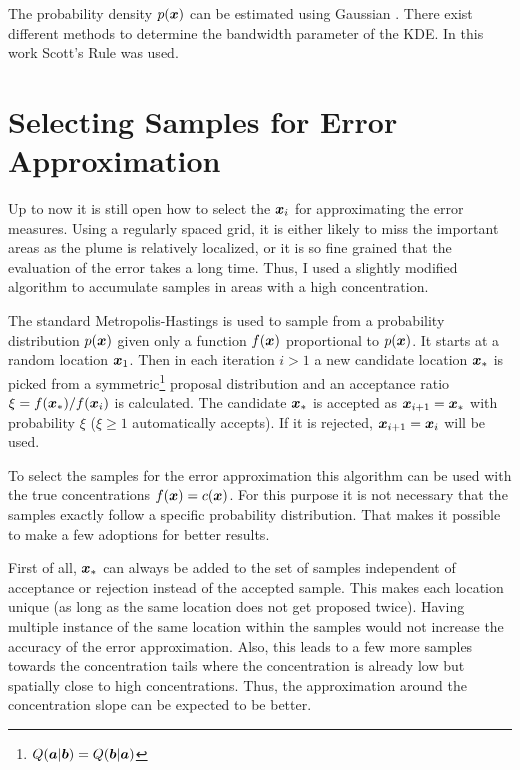 The probability density $p(\bm{x})$ can be estimated using Gaussian 
. There exist different methods to 
determine the bandwidth parameter of the KDE\@. In this work Scott's Rule 
\parencite{Scott:2009tl} was used.

\section{Selecting Samples for Error Approximation}\label{sec:mh}
Up to now it is still open how to select the $\bm{x}_i$ for approximating the 
error measures.  Using a regularly spaced grid, it is either likely to miss the 
important areas as the plume is relatively localized, or it is so fine grained 
that the evaluation of the error takes a long time. Thus, I used a slightly 
modified  algorithm to accumulate samples in 
areas with a high concentration.

The standard Metropolis-Hastings \parencite{Chib:1994ud} is used to sample from 
a probability distribution $p(\bm{x})$ given only a function $f(\bm{x})$ 
proportional to $p(\bm{x})$. It starts at a random location $\bm{x}_1$.  Then in 
each iteration $i > 1$ a new candidate location $\bm{x}_*$ is picked from 
a symmetric\footnote{$Q(\bm{a} | \bm{b}) = Q(\bm{b} | \bm{a})$} proposal 
distribution and an acceptance ratio $\xi = f(\bm{x}_*) / f(\bm{x}_i)$ is 
calculated. The candidate $\bm{x}_*$ is accepted as $\bm{x}_{i + 1} = \bm{x}_*$ 
with probability $\xi$ ($\xi \geq 1$ automatically accepts). If it is rejected, 
$\bm{x}_{i + 1} = \bm{x}_i$ will be used.

To select the samples for the error approximation this algorithm can be used 
with the true concentrations $f(\bm{x}) = c(\bm{x})$. For this purpose it is not 
necessary that the samples exactly follow a specific probability distribution.  
That makes it possible to make a few adoptions for better results.

First of all, $\bm{x}_*$ can always be added to the set of samples independent of 
acceptance or rejection instead of the accepted sample.  This makes each 
location unique (as long as the same location does not get proposed twice).  
Having multiple instance of the same location within the samples would not 
increase the accuracy of the error approximation. Also, this leads to a few more 
samples towards the concentration tails where the concentration is already low 
but spatially close to high concentrations.  Thus, the approximation around the 
concentration slope can be expected to be better.

